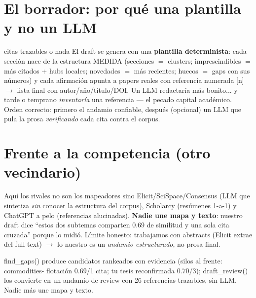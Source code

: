 \documentclass[11pt,a4paper]{article}
\begin{document}
\section{El borrador: por qué una plantilla y no un LLM}

\begin{concepto}{citas trazables o nada}
El draft se genera con una \textbf{plantilla determinista}: cada sección nace de la
estructura MEDIDA (secciones $=$ clusters; imprescindibles $=$ más citados + hubs locales;
novedades $=$ más recientes; huecos $=$ gaps con sus números) y cada afirmación apunta a
papers reales con referencia numerada [n] $\rightarrow$ lista final con autor/año/título/DOI.
Un LLM redactaría más bonito... y tarde o temprano \emph{inventaría} una referencia — el
pecado capital académico. Orden correcto: primero el andamio confiable, después (opcional)
un LLM que pula la prosa \emph{verificando} cada cita contra el corpus.
\end{concepto}

\section{Frente a la competencia (otro vecindario)}

Aquí los rivales no son los mapeadores sino Elicit/SciSpace/Consensus (LLM que sintetiza
\emph{sin} conocer la estructura del corpus), Scholarcy (resúmenes 1-a-1) y ChatGPT a pelo
(referencias alucinadas). \textbf{Nadie une mapa y texto}: nuestro draft dice ``estos dos
subtemas comparten 0.69 de similitud y una sola cita cruzada'' porque lo midió. Límite
honesto: trabajamos con abstracts (Elicit extrae del full text) $\rightarrow$ lo nuestro es
un \emph{andamio estructurado}, no prosa final.

\begin{resumen}
find\_gaps() produce candidatos rankeados con evidencia (silos al frente: commodities-
flotación 0.69/1 cita; tu tesis reconfirmada 0.70/3); draft\_review() los convierte en un
andamio de review con 26 referencias trazables, sin LLM. Nadie más une mapa y texto.
\end{resumen}
\end{document}
